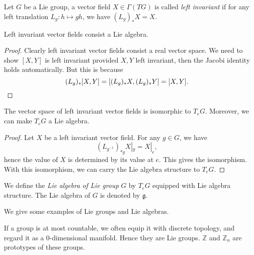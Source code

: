 \begin{defn}
    Let $G$ be a Lie group, a vector field $X\in\Gamma(TG)$ is called \emph{left invariant} if for any left translation $L_g:h\mapsto gh$, we have $(L_g)_*X=X$.
\end{defn}

\begin{prop}
    Left invariant vector fields consist a Lie algebra.
\end{prop}
\begin{proof}
    Clearly left invariant vector fields consist a real vector space.
    We need to show $[X,Y]$ is left invariant provided $X,Y$ left invariant, then the Jacobi identity holds automatically.
    But this is because 
    \[(L_g)_*[X,Y]=[(L_g)_*X,(L_g)_*Y]=[X,Y].\qedhere\]
\end{proof}

\begin{prop}
    The vector space of left invariant vector fields is isomorphic to $T_eG$.
    Moreover, we can make $T_eG$ a Lie algebra.
\end{prop}
\begin{proof}
    Let $X$ be a left invariant vector field.
    For any $g\in G$, we have
    \[(L_{g^{-1}})_{*g}X|_g=X|_e,\]
    hence the value of $X$ is determined by its value at $e$.
    This gives the isomorphism.
    With this isomorphism, we can carry the Lie algebra structure to $T_eG$.
\end{proof}

\begin{defn}
    We define the \emph{Lie algebra of Lie group} $G$ by $T_eG$ equipped with Lie algebra structure.
    The Lie algebra of $G$ is denoted by $\mathfrak{g}$.
\end{defn}

We give some examples of Lie groups and Lie algebras.

\begin{eg}
    If a group is at most countable, we often equip it with discrete topology, and regard it as a $0$-dimensional manifold.
    Hence they are Lie groups.
    $\mathbb{Z}$ and $\mathbb{Z}_n$ are prototypes of these groups.
\end{eg}

